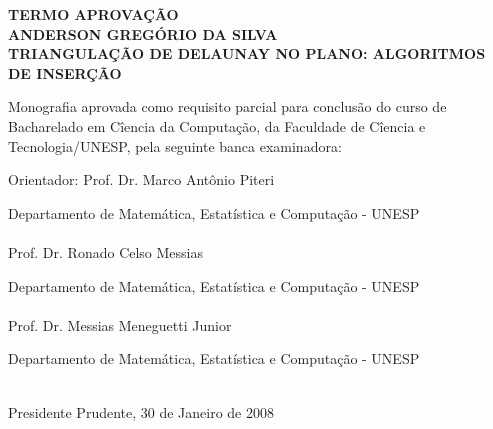 \thispagestyle{empty}
\vspace{20mm}
\begin{center}
\Large \bf{TERMO APROVA\c{C}\~{A}O}\\
\vspace{50mm}
\large ANDERSON GREG\'ORIO DA SILVA\\
\vspace{25mm}
\large TRIANGULA\c{C}\~{A}O DE DELAUNAY NO PLANO: ALGORITMOS DE INSER\c{C}\~{A}O \\
\normalsize
\end{center}
\vspace{15mm}
\begin{minipage}{150mm}
 Monografia aprovada como requisito parcial para conclus\~{a}o do curso de Bacharelado em C\^{i}encia da Computa\c{c}\~{a}o, da Faculdade de C\^{i}encia e Tecnologia/UNESP, pela seguinte banca examinadora:\\
\end{minipage}
\begin{minipage}{150mm}
\vspace{10mm}

Orientador: \hspace{3mm} Prof. Dr. Marco Ant\^{o}nio Piteri

\hspace{25mm} Departamento de Matem\'{a}tica, Estat\'{i}stica e Computa\c{c}\~{a}o - UNESP \\ \\

\hspace{25mm} Prof. Dr. Ronado Celso Messias

\hspace{25mm} Departamento de Matem\'{a}tica, Estat\'{i}stica e Computa\c{c}\~{a}o - UNESP \\ \\

\hspace{25mm} Prof. Dr. Messias Meneguetti Junior

\hspace{25mm} Departamento de Matem\'{a}tica, Estat\'{i}stica e Computa\c{c}\~{a}o - UNESP \\ \\
\end{minipage}
\vspace{12mm}
\begin{center}
Presidente Prudente, 30 de Janeiro de 2008
\end{center}



